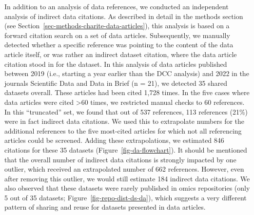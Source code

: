 \documentclass[
  letterpaper,
  DIV=11,
  numbers=noendperiod]{scrartcl}
\begin{document}
In addition to an analysis of data references, we conducted an
independent analysis of indirect data citations. As described in detail
in the methods section (see
Section~\ref{sec-methods-charite-data-articles}), this analysis is based
on a forward citation search on a set of data articles. Subsequently, we
manually detected whether a specific reference was pointing to the
content of the data article itself, or was rather an indirect dataset
citation, where the data article citation stood in for the dataset. In
this analysis of data articles published between 2019 (i.e., starting a
year earlier than the DCC analysis) and 2022 in the journals Scientific
Data and Data in Brief (n = 21), we detected 35 shared datasets overall.
These articles had been cited 1,728 times. In the five cases where data
articles were cited \textgreater60 times, we restricted manual checks to
60 references. In this ``truncated'' set, we found that out of 537
references, 113 references (21\%) were in fact indirect data citations.
We used this to extrapolate numbers for the additional references to the
five most-cited articles for which not all referencing articles could be
screened. Adding these extrapolations, we estimated 846 citations for
these 35 datasets (Figure~\ref{fig-da-flowchart}). It should be
mentioned that the overall number of indirect data citations is strongly
impacted by one outlier, which received an extrapolated number of 662
references. However, even after removing this outlier, we would still
estimate 184 indirect data citations. We also observed that these
datasets were rarely published in omics repositories (only 5 out of 35
datasets; Figure~\ref{fig-repo-dist-ds-da}), which suggests a very
different pattern of sharing and reuse for datasets presented in data
articles.

\vspace{30pt}
\end{document}
